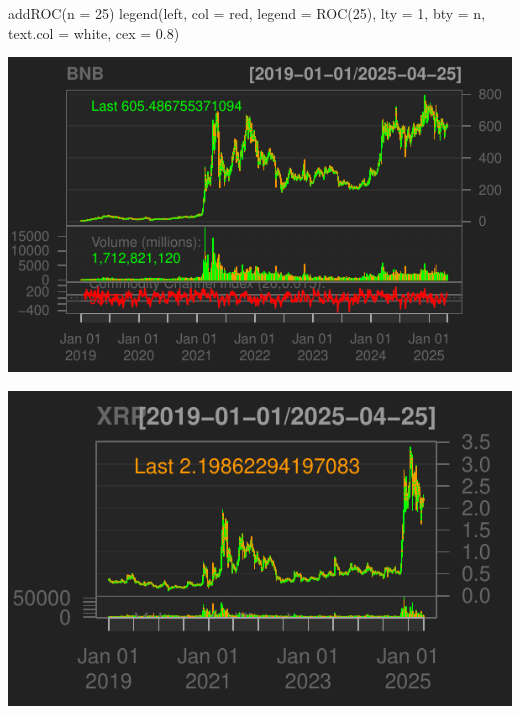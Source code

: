 \documentclass[]{tufte-handout}
\newenvironment{Shaded}{}{}
\newcommand{\AttributeTok}[1]{\textcolor[rgb]{0.49,0.56,0.16}{#1}}
\newcommand{\DecValTok}[1]{\textcolor[rgb]{0.25,0.63,0.44}{#1}}
\newcommand{\FloatTok}[1]{\textcolor[rgb]{0.25,0.63,0.44}{#1}}
\newcommand{\FunctionTok}[1]{\textcolor[rgb]{0.02,0.16,0.49}{#1}}
\newcommand{\NormalTok}[1]{#1}
\newcommand{\OtherTok}[1]{\textcolor[rgb]{0.00,0.44,0.13}{#1}}
\newcommand{\SpecialCharTok}[1]{\textcolor[rgb]{0.25,0.44,0.63}{#1}}
\newcommand{\StringTok}[1]{\textcolor[rgb]{0.25,0.44,0.63}{#1}}
\begin{document}
\begin{Shaded}
\begin{Highlighting}[]
\FunctionTok{addROC}\NormalTok{(}\AttributeTok{n =} \DecValTok{25}\NormalTok{)}
\FunctionTok{legend}\NormalTok{(}\StringTok{\textquotesingle{}left\textquotesingle{}}\NormalTok{, }\AttributeTok{col =} \StringTok{\textquotesingle{}red\textquotesingle{}}\NormalTok{, }\AttributeTok{legend =} \StringTok{\textquotesingle{}ROC(25)\textquotesingle{}}\NormalTok{, }\AttributeTok{lty =} \DecValTok{1}\NormalTok{, }\AttributeTok{bty =} \StringTok{\textquotesingle{}n\textquotesingle{}}\NormalTok{,}
       \AttributeTok{text.col =} \StringTok{\textquotesingle{}white\textquotesingle{}}\NormalTok{, }\AttributeTok{cex =} \FloatTok{0.8}\NormalTok{)}
\end{Highlighting}
\end{Shaded}

\includegraphics{cripto_update_files/figure-latex/unnamed-chunk-11-6}

\begin{Shaded}
\end{Shaded}

\includegraphics{cripto_update_files/figure-latex/unnamed-chunk-11-7}
\end{document}
